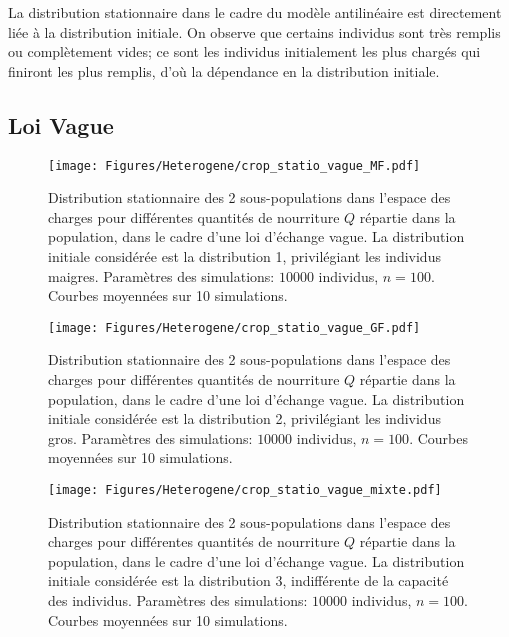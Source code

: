 La distribution stationnaire dans le cadre du modèle antilinéaire est directement liée à la distribution initiale. On observe que certains individus sont très remplis ou complètement vides; ce sont les individus initialement les plus chargés qui finiront les plus remplis, d'où la dépendance en la distribution initiale.


\clearpage

\subsection{Loi Vague}

\begin{figure}[h!]
\centering
\texttt{[image: Figures/Heterogene/crop\_statio\_vague\_MF.pdf]}
\caption{Distribution stationnaire des 2 sous-populations dans l'espace des charges pour différentes quantités de nourriture $Q$ répartie dans la population, dans le cadre d'une loi d'échange vague. La distribution initiale considérée est la distribution 1, privilégiant les individus maigres. Paramètres des simulations: $10000$ individus, $n=100$. Courbes moyennées sur 10 simulations.}
\label{statio_vague_MF}
\end{figure}

\begin{figure}[h!]
\centering
\texttt{[image: Figures/Heterogene/crop\_statio\_vague\_GF.pdf]}
\caption{Distribution stationnaire des 2 sous-populations dans l'espace des charges pour différentes quantités de nourriture $Q$ répartie dans la population, dans le cadre d'une loi d'échange vague. La distribution initiale considérée est la distribution 2, privilégiant les individus gros. Paramètres des simulations: $10000$ individus, $n=100$. Courbes moyennées sur 10 simulations.}
\label{statio_vague_GF}
\end{figure}

\begin{figure}[h!]
\centering
\texttt{[image: Figures/Heterogene/crop\_statio\_vague\_mixte.pdf]}
\caption{Distribution stationnaire des 2 sous-populations dans l'espace des charges pour différentes quantités de nourriture $Q$ répartie dans la population, dans le cadre d'une loi d'échange vague. La distribution initiale considérée est la distribution 3, indifférente de la capacité des individus. Paramètres des simulations: $10000$ individus, $n=100$. Courbes moyennées sur 10 simulations.}
\label{statio_vague_mixte}
\end{figure}


